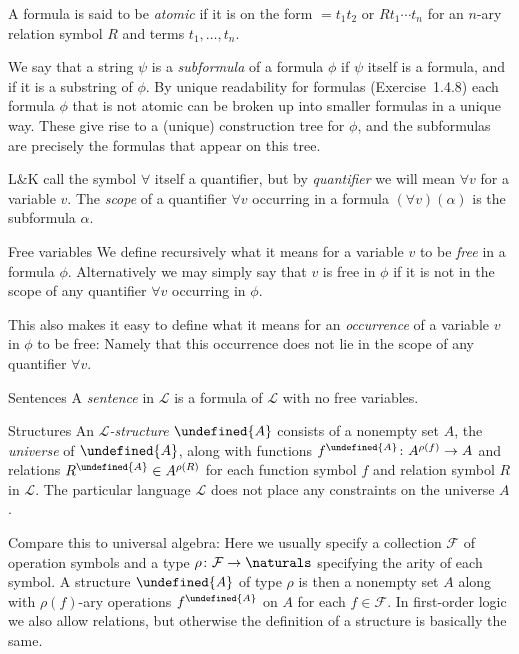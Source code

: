 \documentclass[article, a4paper, 11pt, oneside]{memoir}
\let\mathfrak\undefined
\numberwithin{equation}{chapter}
\newcommand{\calF}{\mathcal{F}}
\newcommand{\calL}{\mathcal{L}}
\newcommand{\frakA}{\mathfrak{A}}
\theoremstyle{nonumberplain}
\begin{document}
\begin{notelist}
    A formula is said to be \emph{atomic} if it is on the form $= t_1 t_2$ or $R t_1 \cdots t_n$ for an $n$-ary relation symbol $R$ and terms $t_1, \ldots, t_n$.
    
    We say that a string $\psi$ is a \emph{subformula} of a formula $\phi$ if $\psi$ itself is a formula, and if it is a substring of $\phi$. By unique readability for formulas (Exercise~1.4.8) each formula $\phi$ that is not atomic can be broken up into smaller formulas in a unique way. These give rise to a (unique) construction tree for $\phi$, and the subformulas are precisely the formulas that appear on this tree.

    L\&K call the symbol $\forall$ itself a quantifier, but by \emph{quantifier} we will mean $\forall v$ for a variable $v$. The \emph{scope} of a quantifier $\forall v$ occurring in a formula $(\forall v)(\alpha)$ is the subformula $\alpha$.

    \item[Free variables]
    We define recursively what it means for a variable $v$ to be \emph{free} in a formula $\phi$. Alternatively we may simply say that $v$ is free in $\phi$ if it is not in the scope of any quantifier $\forall v$ occurring in $\phi$.
    
    This also makes it easy to define what it means for an \emph{occurrence} of a variable $v$ in $\phi$ to be free: Namely that this occurrence does not lie in the scope of any quantifier $\forall v$.

    \item[Sentences]
    A \emph{sentence} in $\calL$ is a formula of $\calL$ with no free variables.
    
    \item[Structures]
    An \emph{$\calL$-structure} $\frakA$ consists of a nonempty set $A$, the \emph{universe} of $\frakA$, along with functions $f^\frakA \colon A^{\rho(f)} \to A$ and relations $R^\frakA \in A^{\rho(R)}$ for each function symbol $f$ and relation symbol $R$ in $\calL$. The particular language $\calL$ does not place any constraints on the universe $A$.
    
    Compare this to universal algebra: Here we usually specify a collection $\calF$ of operation symbols and a type $\rho \colon \calF \to \naturals$ specifying the arity of each symbol. A structure $\frakA$ of type $\rho$ is then a nonempty set $A$ along with $\rho(f)$-ary operations $f^\frakA$ on $A$ for each $f \in \calF$. In first-order logic we also allow relations, but otherwise the definition of a structure is basically the same.


\end{notelist}
\end{document}
